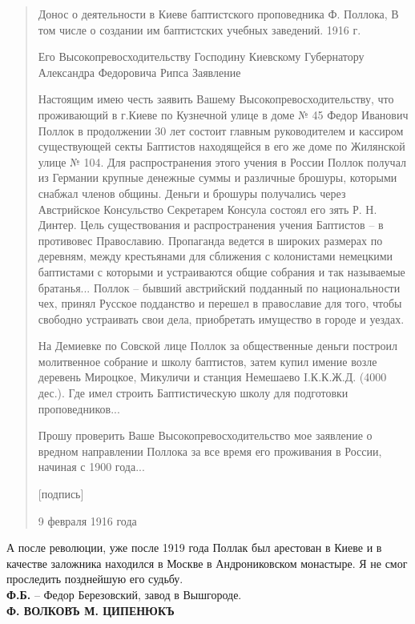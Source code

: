 \begin{quotation}
Донос о деятельности в Киеве баптистского проповедника Ф. Поллока, В том числе о создании им баптистских учебных заведений. 1916 г.

Его Высокопревосходительству Господину Киевскому Губернатору Александра Федоровича Рипса Заявление

Настоящим имею честь заявить Вашему Высокопревосходительству, что проживающий в г.Киеве по Кузнечной улице в доме № 45 Федор Иванович Поллок в продолжении 30 лет состоит главным руководителем и кассиром существующей секты Баптистов находящейся в его же доме по Жилянской улице № 104. Для распространения этого учения в России Поллок получал из Германии крупные денежные суммы и различные брошуры, которыми снабжал членов общины. Деньги и брошуры получались через Австрийское Консульство Секретарем Консула состоял его зять Р. Н. Динтер. Цель существования и распространения учения Баптистов – в противовес Православию. Пропаганда ведется в широких размерах по деревням, между крестьянами для сближения с колонистами немецкими баптистами с которыми и устраиваются общие собрания и так называемые братанья... Поллок – бывший австрийский подданный по национальности чех, принял Русское подданство и перешел в православие для того, чтобы свободно устраивать свои дела, приобретать имущество в городе и уездах.

На Демиевке по Совской лице Поллок за общественные деньги построил молитвенное собрание и школу баптистов, затем купил имение возле деревень Мироцкое, Микуличи и станция Немешаево I.К.К.Ж.Д. (4000 дес.). Где имел строить Баптистическую школу для подготовки проповедников...

Прошу проверить Ваше Высокопревосходительство мое заявление о вредном направлении Поллока за все время его проживания в России, начиная с 1900 года...

[подпись]

9 февраля 1916 года
\end{quotation}

А после революции, уже после 1919 года Поллак был арестован в Киеве и в качестве заложника находился в Москве в Андрониковском монастыре. Я не смог проследить позднейшую его судьбу.\\

\noindent\textbf{Ф.Б.} – Федор Березовский, завод в Вышгороде.\\

\noindent\textbf{Ф. ВОЛКОВЪ М. ЦИПЕНЮКЪ}\\

